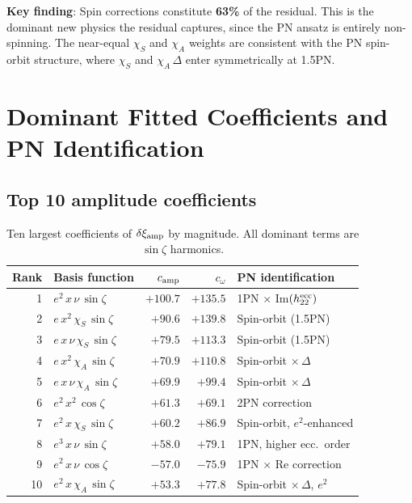 \documentclass[11pt,letterpaper]{article}
\newcommand{\dxamp}{\delta\xi_{\rm amp}}
\newcommand{\chiS}{\chi_S}
\newcommand{\chiA}{\chi_A}
\begin{document}
\noindent \textbf{Key finding}: Spin corrections constitute \textbf{63\%} of the residual. This is the dominant new physics the residual captures, since the PN ansatz is entirely non-spinning. The near-equal $\chiS$ and $\chiA$ weights are consistent with the PN spin-orbit structure, where $\chiS$ and $\chiA\,\Delta$ enter symmetrically at 1.5PN.

\section{Dominant Fitted Coefficients and PN Identification}
\label{sec:dominant}

\subsection{Top 10 amplitude coefficients}

\begin{table}[H]
\centering
\caption{Ten largest coefficients of $\dxamp$ by magnitude. All dominant terms are $\sin\zeta$ harmonics.}
\label{tab:top10}
\begin{tabular}{@{}rlrrl@{}}
\toprule
Rank & Basis function & $c_{\rm amp}$ & $c_\omega$ & PN identification \\
\midrule
1 & $e^2\, x\, \nu\, \sin\zeta$ & $+100.7$ & $+135.5$ & 1PN $\times$ Im$(h_{22}^{\rm ecc})$ \\
2 & $e\, x^2\, \chiS\, \sin\zeta$ & $+90.6$ & $+139.8$ & Spin-orbit (1.5PN) \\
3 & $e\, x\, \nu\, \chiS\, \sin\zeta$ & $+79.5$ & $+113.3$ & Spin-orbit (1.5PN) \\
4 & $e\, x^2\, \chiA\, \sin\zeta$ & $+70.9$ & $+110.8$ & Spin-orbit $\times\,\Delta$ \\
5 & $e\, x\, \nu\, \chiA\, \sin\zeta$ & $+69.9$ & $+99.4$ & Spin-orbit $\times\,\Delta$ \\
6 & $e^2\, x^2\, \cos\zeta$ & $+61.3$ & $+69.1$ & 2PN correction \\
7 & $e^2\, x\, \chiS\, \sin\zeta$ & $+60.2$ & $+86.9$ & Spin-orbit, $e^2$-enhanced \\
8 & $e^3\, x\, \nu\, \sin\zeta$ & $+58.0$ & $+79.1$ & 1PN, higher ecc.\ order \\
9 & $e^2\, x\, \nu\, \cos\zeta$ & $-57.0$ & $-75.9$ & 1PN $\times$ Re correction \\
10 & $e^2\, x\, \chiA\, \sin\zeta$ & $+53.3$ & $+77.8$ & Spin-orbit $\times\,\Delta$, $e^2$ \\
\bottomrule
\end{tabular}
\end{table}
\end{document}
